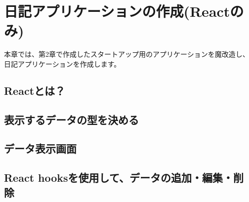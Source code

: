 \chapter{日記アプリケーションの作成(Reactのみ)}
\label{chap:03-todo-with-react}
\begin{starterabstract}
  本章では、第2章で作成したスタートアップ用のアプリケーションを魔改造し、日記アプリケーションを作成します。
\end{starterabstract}

\section{Reactとは？}
\keeplastskip{
  \label{sec:3-1}
  \label{sec-031React}
  \par\nobreak
}

\section{表示するデータの型を決める}
\keeplastskip{
  \label{sec:3-2}
  \label{sec-032UIDataType}
  \par\nobreak
}

\section{データ表示画面}
\keeplastskip{
  \label{sec:3-3}
  \label{sec-033UI}
  \par\nobreak
}

\section{React hooksを使用して、データの追加・編集・削除}
\keeplastskip{
  \label{sec:3-4}
  \label{sec-034hooks}
  \par\nobreak
}
